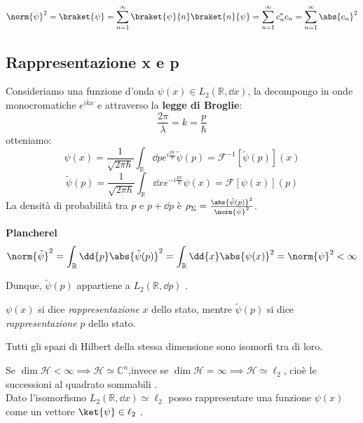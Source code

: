 \begin{example}
    \[
    \norm{\psi}^2= \braket{\psi}= \sum_{n=1}^{\infty} \braket{\psi}{n}\braket{n}{\psi}=
    \sum_{n=1}^{\infty}c^*_n c_n    = \sum_{n=1}^{\infty} \abs{c_n}^2   
    \]
\end{example}


\subsection{Rappresentazione x e p}
Consideriamo una funzione d'onda \(\psi(x) \in L_2(\mathbb{R}, \dd{x})\),
la decompongo in onde monocromatiche \(e^{ikx}\) e attraverso la \textbf{legge di Broglie}: 
\begin{equation}
    \frac{2\pi}{\lambda}= k = \frac{p}{\hbar}
\end{equation}
otteniamo:
\begin{equation}
    \psi(x)= \frac{1}{\sqrt{2\pi\hbar}}\int_{\mathbb{R}} \dd{p} e^{i\frac{px}{\hbar}} \tilde{\psi}(p) = \mathcal{F}^{-1}[\tilde{\psi}(p)](x)
\end{equation}
\begin{equation}
    \tilde{\psi}(p)= \frac{1}{\sqrt{2\pi\hbar}}\int_{\mathbb{R}} \dd{x} e^{-i\frac{px}{\hbar}} \psi(x)= \mathcal{F}[\psi(x)](p)
\end{equation}
La densità di probabilità tra \(p\) e \(p +\dd{p}\) è \(\rho_\Sigma= \frac{\abs{\tilde{\psi}(p)}^2}{\norm{\tilde{\psi}}^2}\).
\begin{theorem}
    \textbf{Plancherel}
    \begin{equation}
        \norm{\tilde{\psi}}^2= \int_{\mathbb{R}} \dd{p} \abs{\tilde{\psi}(p)}^2= \int_{\mathbb{R}} \dd{x} \abs{\psi(x)}^2 = \norm{\psi}^2 <\infty
    \end{equation}
\end{theorem}
Dunque, \(\tilde{\psi}(p)\) appartiene a \(L_2(\mathbb{R},\dd{p})\) .

\begin{definition}
    \(\psi(x)\) si dice \textit{rappresentazione} \(x\) dello stato, mentre
    \(\tilde{\psi}(p)\) si dice \textit{rappresentazione} \(p\) dello stato.
\end{definition}

\begin{theorem}
    Tutti gli spazi di Hilbert della stessa dimensione sono isomorfi tra di loro.
\end{theorem}

\begin{example}
    Se \(\operatorname{dim} \mathcal{H} < \infty \implies \mathcal{H}\simeq \mathbb{C}^n\),invece
    se \(\operatorname{dim} \mathcal{H} = \infty \implies \mathcal{H} \simeq \ell_2\), cioè le successioni al quadrato sommabili  .\\
    Dato l'isomorfismo \(L_2(\mathbb{R},\dd{x})\simeq \ell_2\) posso rappresentare una funzione \(\psi(x)\) come un vettore \(\ket{\psi}\in \ell_2\) .
\end{example}

